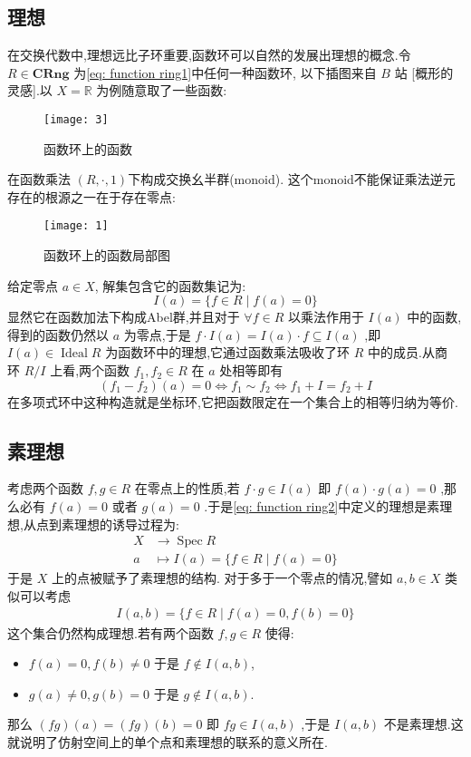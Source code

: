 \subsection{理想}
在交换代数中,理想远比子环重要,函数环可以自然的发展出理想的概念.令 $R \in \mathbf{C R n g}$ 为\eqref{eq: function ring1}中任何一种函数环, 以下插图来自 $B$ 站 [概形的灵感].以 $X=\mathbb{R}$ 为例随意取了一些函数:
\begin{figure}[htbp]
  \centering
  \texttt{[image: 3]}
  \caption{函数环上的函数}
  \label{fig: function ring1}
\end{figure}
在函数乘法 $(R,\cdot,1)$下构成交换幺半群(monoid). 这个monoid不能保证乘法逆元存在的根源之一在于存在零点:
\begin{figure}[htbp]
  \centering
  \texttt{[image: 1]}
  \caption{函数环上的函数局部图}
  \label{fig: function ring2}
\end{figure}
给定零点 $a\in X$, 解集包含它的函数集记为:
\begin{equation}\label{eq: function ring2}
  I(a)=\{f \in R \mid f(a)=0\}
  \end{equation}
  显然它在函数加法下构成Abel群,并且对于 $\forall f \in R$ 以乘法作用于 $I(a)$ 中的函数,得到的函数仍然以 $a$ 为零点,于是 $f \cdot I(a)=I(a) \cdot f \subseteq I(a)$ ,即 $I(a) \in \operatorname{Ideal} R$ 为函数环中的理想,它通过函数乘法吸收了环 $R$ 中的成员.从商 环 $R / I$ 上看,两个函数 $f_1, f_2 \in R$ 在 $a$ 处相等即有
  \begin{equation*}
  \left(f_1-f_2\right)(a)=0 \Leftrightarrow f_1 \sim f_2 \Leftrightarrow f_1+I=f_2+I
  \end{equation*}
  在多项式环中这种构造就是坐标环,它把函数限定在一个集合上的相等归纳为等价.
  \subsection{素理想}
  考虑两个函数 $f, g \in R$ 在零点上的性质,若 $f \cdot g \in I(a)$ 即 $f(a) \cdot g(a)=0$ ,那么必有 $f(a)=0$ 或者 $g(a)=0$ .于是\eqref{eq: function ring2}中定义的理想是素理想,从点到素理想的诱导过程为:
  \begin{equation}\label{eq: function ring3}
  \begin{aligned}
  X & \rightarrow \operatorname{Spec} R \\
  a & \mapsto I(a)=\{f \in R \mid f(a)=0\}
  \end{aligned}
  \end{equation}
  于是 $X$ 上的点被赋予了素理想的结构.
  对于多于一个零点的情况,譬如 $a, b \in X$ 类似可以考虑
  \begin{align*}
  I(a, b)=\{f \in R \mid f(a)=0, f(b)=0\}
  \end{align*}
  这个集合仍然构成理想.若有两个函数 $f, g \in R$ 使得:
  \begin{itemize}
    \item $f(a)=0, f(b) \neq 0$ 于是 $f \notin I(a, b)$,
    \item $g(a) \neq 0, g(b)=0$ 于是 $g \notin I(a, b)$.
  \end{itemize}
  那么 $(f g)(a)=(f g)(b)=0$ 即 $f g \in I(a, b)$ ,于是 $I(a, b)$ 不是素理想.这就说明了仿射空间上的单个点和素理想的联系的意义所在.

